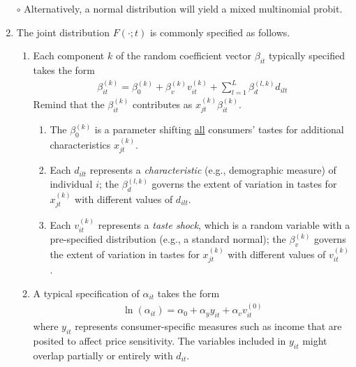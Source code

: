 \documentclass[11pt]{elegantbook}
\begin{document}
\begin{enumerate}
    \subitem $\circ$ Alternatively, a normal distribution will yield a mixed multinomial probit.
    \item The joint distribution $F(\cdot;t)$ is commonly specified as follows.
    \begin{enumerate}
        \item Each component $k$ of the random coefficient vector $\beta_{it}$ typically specified takes the form
        \begin{equation}
            \begin{aligned}
                \beta_{it}^{(k)}=\beta_{0}^{(k)}+\beta_{v}^{(k)}v_{it}^{(k)}+\sum_{l=1}^L\beta_{d}^{(l,k)}d_{ilt}
            \end{aligned}
            \label{eq:beta_it}
        \end{equation}
        Remind that the $\beta_{it}^{(k)}$ contributes as $x_{jt}^{(k)}\beta_{it}^{(k)}$.
        \begin{enumerate}
            \item The $\beta_{0}^{(k)}$ is a parameter shifting \underline{all} consumers' tastes for additional characteristics $x_{jt}^{(k)}$.
            \item Each $d_{ilt}$ represents a \textit{characteristic} (e.g., demographic measure) of individual $i$; the $\beta_{d}^{(l,k)}$ governs the extent of variation in tastes for $x_{jt}^{(k)}$ with different values of $d_{ilt}$.
            \item Each $v_{it}^{(k)}$ represents a \textit{taste shock}, which is a random variable with a pre-specified distribution (e.g., a standard normal); the $\beta_{v}^{(k)}$ governs the extent of variation in tastes for $x_{jt}^{(k)}$ with different values of $v_{it}^{(k)}$.
        \end{enumerate}
        \item A typical specification of $\alpha_{it}$ takes the form
        \begin{equation}
            \begin{aligned}
                \ln\left(\alpha_{it}\right)=\alpha_0+\alpha_y y_{it}+\alpha_v v_{it}^{(0)}
            \end{aligned}
            \label{eq:alpha_it}
        \end{equation}
        where $y_{it}$ represents consumer-specific measures such as income that are posited to affect price sensitivity. The variables included in $y_{it}$ might overlap partially or entirely with $d_{it}$.
    \end{enumerate}
\end{enumerate}
\end{document}
